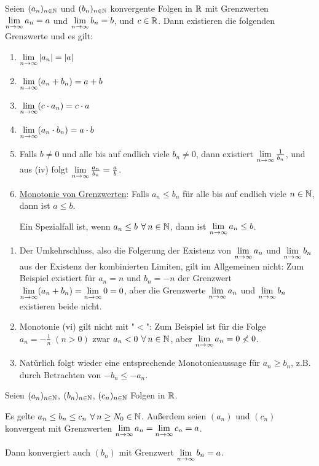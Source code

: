 \begin{proposition}
    \label{prop-rechenregeln-für-limiten}
    Seien $(a_n)_{n \in \mathbb{N}}$ und $(b_n)_{n \in \mathbb{N}}$ konvergente Folgen in $\mathbb{R}$ mit Grenzwerten $\lim\limits_{n \rightarrow \infty} a_n = a$ und $\lim\limits_{n \rightarrow \infty} b_n = b$, und $c \in \mathbb{R}$. Dann existieren die folgenden Grenzwerte und es gilt:
    \begin{enumerate}
        \item $\lim\limits_{n \rightarrow \infty} |a_n| = |a|$
        \item $\lim\limits_{n \rightarrow \infty} (a_n + b_n) = a + b$
        \item $\lim\limits_{n \rightarrow \infty} (c \cdot a_n) = c \cdot a$
        \item $\lim\limits_{n \rightarrow \infty} (a_n \cdot b_n) = a \cdot b$
        \item Falls $b \neq 0$ und alle bis auf endlich viele $b_n \neq 0$, dann existiert $\lim\limits_{n \rightarrow \infty} \frac{1}{b_n}$, und aus (iv) folgt $\lim\limits_{n \rightarrow \infty} \frac{a_n}{b_n} = \frac{a}{b}$.
        \item \underline{Monotonie von Grenzwerten}: Falls $a_n \leq b_n$ für alle bis auf endlich viele $n \in \mathbb{N}$, dann ist $a \leq b$.

        Ein Spezialfall ist, wenn $a_n \leq b \forall n \in \N$, dann ist $\lim\limits_{n \rightarrow \infty} a_n \leq b$.
    \end{enumerate}
\end{proposition}

\begin{remark}
    \label{remark-rechenregeln-für-limiten}
    \begin{enumerate}
        \item Der Umkehrschluss, also die Folgerung der Existenz von $\lim\limits_{n \rightarrow \infty} a_n$ und $\lim\limits_{n \rightarrow \infty} b_n$ aus der Existenz der kombinierten Limiten, gilt im Allgemeinen nicht: Zum Beispiel existiert für $a_n = n$ und $b_n = -n$ der Grenzwert $\lim\limits_{n \rightarrow \infty} (a_n + b_n) = \lim\limits_{n \rightarrow \infty} 0 = 0$, aber die Grenzwerte $\lim\limits_{n \rightarrow \infty} a_n$ und $\lim\limits_{n \rightarrow \infty} b_n$ existieren beide nicht.
        \item Monotonie (vi) gilt nicht mit "$<$": Zum Beispiel ist für die Folge $a_n = -\frac{1}{n} \; (n > 0)$ zwar $a_n < 0 \forall n \in \N$, aber $\lim\limits_{n \rightarrow \infty} a_n = 0 \nless 0$.
        \item Natürlich folgt wieder eine entsprechende Monotonieaussage für $a_n \geq b_n$, z.B. durch Betrachten von $-b_n \leq -a_n$.
    \end{enumerate}
\end{remark}

\begin{lemma}[Sandwichlemma]
    Seien $(a_n)_{n \in \mathbb{N}}$, $(b_n)_{n \in \mathbb{N}}$, $(c_n)_{n \in \mathbb{N}}$ Folgen in $\mathbb{R}$.
    
    Es gelte $a_n \leq b_n \leq c_n \forall n \geq N_0 \in \N$. Außerdem seien $(a_n)$ und $(c_n)$ konvergent mit Grenzwerten $\lim\limits_{n \rightarrow \infty} a_n = \lim\limits_{n \rightarrow \infty} c_n = a$.

    Dann konvergiert auch $(b_n)$ mit Grenzwert $\lim\limits_{n \rightarrow \infty} b_n = a$.
\end{lemma}

